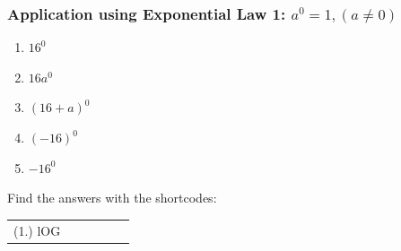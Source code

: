             \subsubsection{  Application using Exponential Law 1: ${a}^{0}=1,\left(a\ne 0\right)$ }
            \nopagebreak
        \label{m38359*id63666}\begin{enumerate}[noitemsep, label=\textbf{\arabic*}. ] 
            \label{m38359*uid6}\item 
            ${16}^{0}$
      \label{m38359*uid7}\item 
        $16{a}^{0}$
      \label{m38359*uid8}\item 
        ${\left(16+a\right)}^{0}$
      \label{m38359*uid9}\item 
        ${\left(-16\right)}^{0}$
      \label{m38359*uid10}\item 
        $-{16}^{0}$ 
\newline
\newline
          \end{enumerate}
      \label{m38359*uid11}
\par {} Find the answers with the shortcodes:
 \par \begin{tabular}[h]{cccccc}
 (1.) lOG  & \end{tabular}
